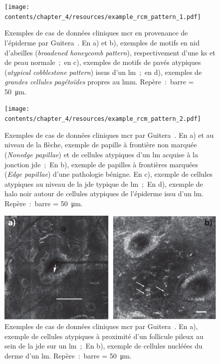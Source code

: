 \begin{figure}[p]
    \begin{center}
        \texttt{[image: contents/chapter\_4/resources/example\_rcm\_pattern\_1.pdf]}
        \caption{Exemples de cas de données cliniques \gls{mcr} en provenance de l'épiderme par Guitera~. En a) et b), exemples de motifs en nid d'abeilles (\textit{broadened honeycomb pattern}), respectivement d'une \gls{ks} et de peau normale~;~en c), exemples de motifs de pavés atypiques (\textit{atypical cobblestone pattern}) issus d'un \gls{lm}~;~en d), exemples de \textit{grandes cellules pagétoïdes} propres au \gls{lmm}. Repère~:~barre = \SI{50}{\micro\metre}.}
        \label{fig:example_rcm_pattern_1}
    \end{center} 
\end{figure}\par

\begin{figure}[p]
    \begin{center}
        \texttt{[image: contents/chapter\_4/resources/example\_rcm\_pattern\_2.pdf]}
        \caption{Exemples de cas de données cliniques \gls{mcr} par Guitera~. En a) et au niveau de la flèche, exemple de papille à frontière non marquée (\textit{Nonedge papillae}) et de cellules atypiques d'un \gls{lm} acquise à la jonction \gls{jde}~;~En b), exemple de papilles à frontières marquées (\textit{Edge papillae}) d'une pathologie bénigne. En c), exemple de cellules atypiques au niveau de la \gls{jde} typique de \gls{lm}~;~En d), exemple de halo noir autour de cellules atypiques de l'épiderme issu d'un \gls{lm}. Repère~:~barre = \SI{50}{\micro\metre}.}
        \label{fig:example_rcm_pattern_2}
    \end{center} 
\end{figure}\par

\begin{figure}[H]
    \begin{center}
        \includegraphics[width=\linewidth]{contents/chapter_4/resources/example_rcm_pattern_3.pdf}
        \caption{Exemples de cas de données cliniques \gls{mcr} par Guitera~. En a), exemple de cellules atypiques à proximité d'un follicule pileux au sein de la \gls{jde} sur un \gls{lm}~;~En b), exemple de cellules nucléées du derme d'un \gls{lm}. Repère~:~barre = \SI{50}{\micro\metre}.}
        \label{fig:example_rcm_pattern_3}
    \end{center} 
\end{figure}\par

